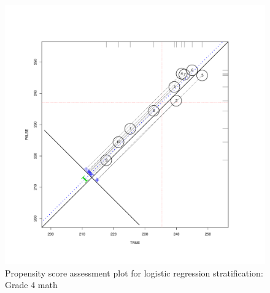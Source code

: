 \documentclass[letterpaper,12p,twoside]{article} %
\begin{document}
\clearpage

\begin{figure}[t]
\begin{center}
\includegraphics[width=\textwidth]{../Figures2009/g4math-circpsa10.pdf}
\caption{Propensity score assessment plot for logistic regression stratification: Grade 4 math}
\label{fig:g4math:circpsa}
\end{center}
\end{figure}
\end{document}
